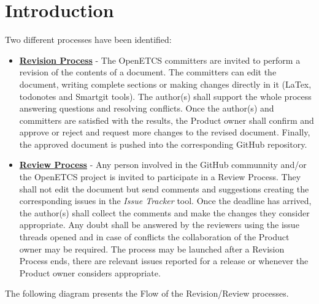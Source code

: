\documentclass{template/openetcs_article}
\begin{document}
\newpage

\section{Introduction}
Two different processes have been identified:
\begin{itemize}
\item \underline{\textbf{Revision Process}} - The OpenETCS committers are invited to perform a revision of the contents of a document. The committers can edit the document, writing complete sections or making changes directly in it (LaTex, todonotes and Smartgit tools). The author(s) shall support the whole process answering questions and resolving conflicts. Once the author(s) and committers are satisfied with the results, the Product owner shall confirm and approve or reject and request more changes to the revised document. Finally, the approved document is pushed into the corresponding GitHub repository.
\item \underline{\textbf{Review Process}} - Any person involved in the GitHub communnity and/or the OpenETCS project is invited to participate in a Review Process. They shall not edit the document but send comments and suggestions creating the corresponding issues in the {\it Issue Tracker} tool. Once the deadline has arrived, the author(s) shall collect the comments and make the changes they consider appropriate. Any doubt shall be answered by the reviewers using the issue threads opened and in case of conflicts the collaboration of the Product owner may be required. The process may be launched after a Revision Process ends, there are relevant issues reported for a release or whenever the Product owner considers appropriate. 
\end{itemize}

The following diagram presents the Flow of the Revision/Review processes.
\end{document}
